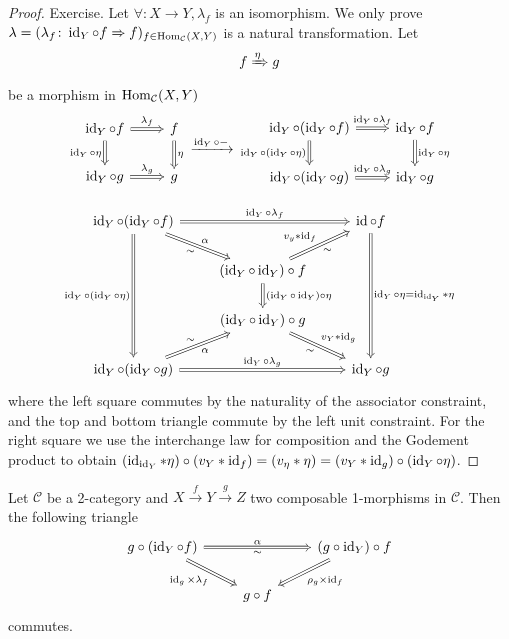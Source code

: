 \begin{proof}
	Exercise.
	Let $ \forall \colon X \to Y, \lambda_f $ is an isomorphism.
	We only prove $ \lambda = ( \lambda_f \colon \operatorname{id}_Y \circ f \Rightarrow f )_{ f \in \operatorname{Hom}_{ \mathcal{C } } ( X , Y ) }$ is a natural transformation.
	Let 
	\[
		f \xRightarrow{\eta} g
	\]
	be a morphism in $ \operatorname{Hom}_{ \mathcal{ C } } ( X, Y )$ 
	\[
	\begin{tikzcd}
		\id_Y \circ f 
		\ar[d, Rightarrow, "\id_Y \circ \eta"']
		\ar[r, Rightarrow, "\lambda_f"]
		&
		f
		\ar[d, Rightarrow, "\eta"]
		\\
		\id_Y \circ g 
		\ar[r, Rightarrow, "\lambda_g"]
		& 
		g
	\end{tikzcd}
	\xrightarrow{ \id_Y \circ - }
	\begin{tikzcd}
		\id_Y \circ ( \id_Y \circ f ) 
		\ar[r,Rightarrow, "\id_Y \circ \lambda_f"]
		\ar[d, Rightarrow, "\id_Y \circ ( \id_Y \circ \eta )"']
		&
		\id_Y \circ f
		\ar[d, Rightarrow, " \id_Y \circ \eta"]
		\\
		\id_Y \circ ( \id_Y \circ g )
		\ar[r, Rightarrow, " \id_Y \circ \lambda_g "]
		&
		\id_Y \circ g
	\end{tikzcd}
	\]
	
	\[
	\begin{tikzcd}
		\id_Y \circ ( \id_Y \circ f )
		\ar[ddd,Rightarrow, " \id_Y \circ ( \id_Y \circ \eta )"']
		\ar[rr, Rightarrow, " \id_Y \circ\lambda_f" ]
		\ar[rd, Rightarrow, "\sim"', "\alpha"]
		&&
		\id \circ f 
		\ar[ddd,Rightarrow, " \id_Y \circ \eta = \id_{ \id_Y } * \eta "]
		\\
		&
		(\id_Y \circ \id_Y ) \circ f 
		\ar[ru,Rightarrow, " v_y * \id_f","\sim"']
		\ar[d, Rightarrow, " ( \id_Y \circ \id_Y) \circ \eta" ]
		\\
		&
		(\id_Y \circ \id_Y ) \circ g
		\ar[rd, Rightarrow, "v_Y * \id_g", "\sim"']
		\\
		\id_Y \circ ( \id_Y \circ g ) 
		\ar[ru, Rightarrow, "\sim", " \alpha"']
		\ar[rr, Rightarrow, " \id_Y \circ \lambda_g "]	
		&&
		\id_Y \circ g
	\end{tikzcd}
	\]
	where the left square commutes by the naturality of the associator constraint, and the top and bottom triangle commute by the left unit constraint.
	For the right square we use the interchange law for composition and the Godement product to obtain $ ( \operatorname{id}_{ \operatorname{id}_Y } * \eta ) \circ ( v_Y * \operatorname{id}_f ) = ( v_\eta * \eta ) = ( v_Y * \operatorname{id}_g ) \circ ( \operatorname{id}_Y \circ \eta ) $.
\end{proof}

\begin{prop}
	Let $ \mathcal{ C } $ be a 2-category and $ X \xrightarrow{ f } Y \xrightarrow{ g } Z $ two composable 1-morphisms in $\mathcal{ C }$.
	Then the following triangle 
	\[
	\begin{tikzcd}
		g \circ ( \id_Y \circ f)
		\ar[rr, Rightarrow, "\alpha", "\sim"']
		\ar[rd, Rightarrow,"\id_g \times \lambda_f"']
		&&
		( g \circ \id_Y ) \circ f 
		\ar[dl, Rightarrow, " \rho_g \times \id_f"]
		\\
		&
		g \circ f 
	\end{tikzcd}
	\]
	commutes.
\end{prop}

